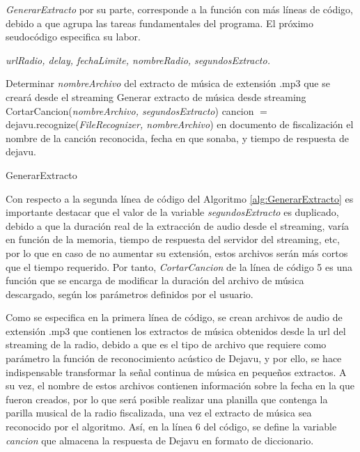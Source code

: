\textit{GenerarExtracto} por su parte, corresponde a la función con más líneas de código, debido a que agrupa las tareas fundamentales del programa. El próximo seudocódigo especifica su labor.

\begin{algorithm}
\begin{algorithmic}[1]
\REQUIRE \textit{urlRadio, delay, fechaLimite, nombreRadio, segundosExtracto.}

\STATE Determinar \textit{nombreArchivo} del extracto de música de extensión .mp3 que se creará desde el streaming
\STATE Generar extracto de música desde streaming
\ENDWHILE 
\STATE CortarCancion(\textit{nombreArchivo, segundosExtracto})
\STATE cancion $=$ dejavu.recognize(\textit{FileRecognizer, nombreArchivo})
\PRINT en documento de fiscalización el nombre de la canción reconocida, fecha en que sonaba, y tiempo de respuesta de dejavu.

\end{algorithmic}
\caption{GenerarExtracto}\label{alg:GenerarExtracto}
\end{algorithm}



Con respecto a la segunda línea de código del Algoritmo \ref{alg:GenerarExtracto} es importante destacar que el valor de la variable \textit{segundosExtracto} es duplicado, debido a que la duración real de la extracción de audio desde el streaming, varía en función de la memoria, tiempo de respuesta del servidor del streaming, etc, por lo que en caso de no aumentar su extensión, estos archivos serán más cortos que el tiempo requerido. Por tanto, \textit{CortarCancion} de la línea de código 5 es una función que se encarga de modificar la duración del archivo de música descargado, según los parámetros definidos por el usuario.

Como se especifica en la primera línea de código, se crean archivos de audio de extensión .mp3 que contienen los extractos de música obtenidos desde la url del streaming de la radio, debido a que es el tipo de archivo que requiere como parámetro la función de reconocimiento acústico de Dejavu, y por ello, se hace indispensable transformar la señal continua de música en pequeños extractos. A su vez, el nombre de estos archivos contienen información sobre la fecha en la que fueron creados, por lo que será posible realizar una planilla que contenga la parilla musical de la radio fiscalizada, una vez el extracto de música sea reconocido por el algoritmo. Así, en la línea 6 del código, se define la variable \textit{cancion} que almacena la respuesta de Dejavu en formato de diccionario. 

